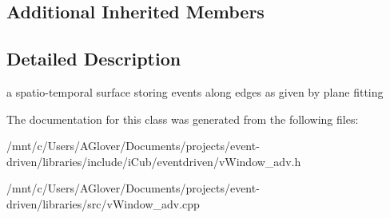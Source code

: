 \subsection*{Additional Inherited Members}


\subsection{Detailed Description}
a spatio-\/temporal surface storing events along edges as given by plane fitting 

The documentation for this class was generated from the following files\+:\begin{DoxyCompactItemize}
\item 
/mnt/c/\+Users/\+A\+Glover/\+Documents/projects/event-\/driven/libraries/include/i\+Cub/eventdriven/v\+Window\+\_\+adv.\+h\item 
/mnt/c/\+Users/\+A\+Glover/\+Documents/projects/event-\/driven/libraries/src/v\+Window\+\_\+adv.\+cpp\end{DoxyCompactItemize}
